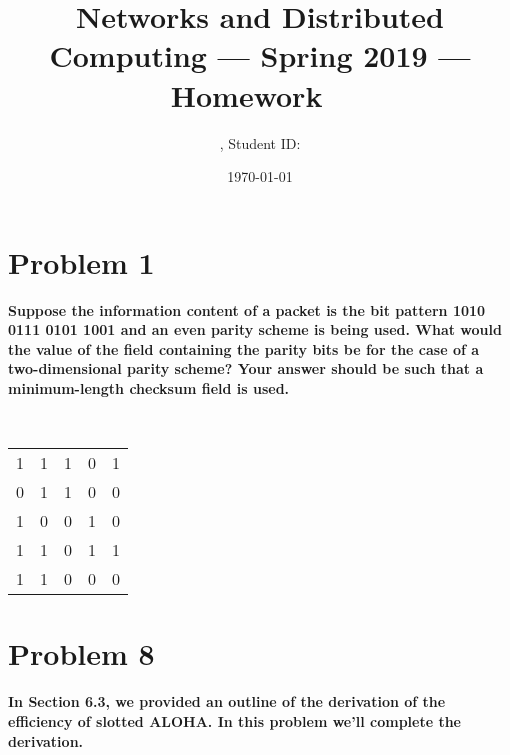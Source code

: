 \documentclass[11pt]{article}
\title{\Large Networks and Distributed Computing --- Spring 2019 --- Homework \Homework\ }
\author{\Name, Student ID: \SID}
\date{\today}
\begin{document}
\maketitle

\section{Problem 1}

\textbf{Suppose the information content of a packet is the bit pattern 1010 0111 0101 1001 and an even parity scheme is being used. What would the value of the field containing the parity bits be for the case of a two-dimensional parity scheme? Your answer should be such that a minimum-length checksum field is used.}

~\\

\begin{tabular}{cccc|c}
1 & 1 & 1 & 0 & 1 \\ 
0 & 1 & 1 & 0 & 0 \\ 
1 & 0 & 0 & 1 & 0 \\
1 & 1 & 0 & 1 & 1 \\
\hline
1 & 1 & 0 & 0 & 0 \\
\end{tabular}

\newpage
\section{Problem 8}

\textbf{In Section 6.3, we provided an outline of the derivation of the efficiency of slotted ALOHA. In this problem we’ll complete the derivation.}
\end{document}
